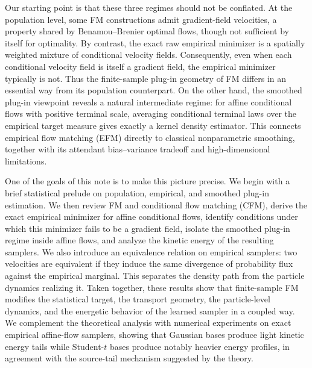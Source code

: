 \documentclass[a4paper,11pt]{article}
\theoremstyle{plain}
\theoremstyle{definition}
\begin{document}
Our starting point is that these three regimes should not be conflated. At the population level, some FM constructions admit gradient-field velocities, a property shared by Benamou--Brenier optimal flows, though not sufficient by itself for optimality. By contrast, the exact raw empirical minimizer is a spatially weighted mixture of conditional velocity fields. Consequently, even when each conditional velocity field is itself a gradient field, the empirical minimizer typically is not. Thus the finite-sample plug-in geometry of FM differs in an essential way from its population counterpart. On the other hand, the smoothed plug-in viewpoint reveals a natural intermediate regime: for affine conditional flows with positive terminal scale, averaging conditional terminal laws over the empirical target measure gives exactly a kernel density estimator. This connects empirical flow matching (EFM) directly to classical nonparametric smoothing, together with its attendant bias--variance tradeoff and high-dimensional limitations.

One of the goals of this note is to make this picture precise. We begin with a brief statistical prelude on population, empirical, and smoothed plug-in estimation. We then review FM and conditional flow matching (CFM), derive the exact empirical minimizer for affine conditional flows, identify conditions under which this minimizer fails to be a gradient field, isolate the smoothed plug-in regime inside affine flows, and analyze the kinetic energy of the resulting samplers. We also introduce an equivalence relation  on empirical samplers: two velocities are equivalent if they induce the same divergence of probability flux \cite{horvat2024gauge} against the empirical marginal. This separates the density path from the particle dynamics realizing it. Taken together, these results show that finite-sample FM modifies the statistical target, the transport geometry, the particle-level dynamics, and the energetic behavior of the learned sampler in a coupled way. We complement the theoretical analysis with numerical experiments on exact empirical affine-flow samplers, showing that Gaussian bases produce light kinetic energy tails while Student-\(t\) bases produce notably heavier energy profiles, in agreement with the source-tail mechanism suggested by the theory.
\end{document}
